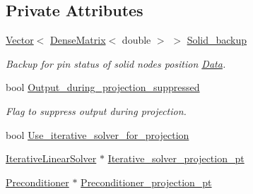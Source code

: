 \subsection*{Private Attributes}
\begin{DoxyCompactItemize}
\item 
\hyperlink{classoomph_1_1Vector}{Vector}$<$ \hyperlink{classoomph_1_1DenseMatrix}{Dense\+Matrix}$<$ double $>$ $>$ \hyperlink{classoomph_1_1ProjectionProblem_af085e8e2152466d7a98eebff07ea9271}{Solid\+\_\+backup}
\begin{DoxyCompactList}\small\item\em Backup for pin status of solid node\textquotesingle{}s position \hyperlink{classoomph_1_1Data}{Data}. \end{DoxyCompactList}\item 
bool \hyperlink{classoomph_1_1ProjectionProblem_a628ff404b240c75244eea7d38e5363dd}{Output\+\_\+during\+\_\+projection\+\_\+suppressed}
\begin{DoxyCompactList}\small\item\em Flag to suppress output during projection. \end{DoxyCompactList}\item 
bool \hyperlink{classoomph_1_1ProjectionProblem_a917be524f0312bcf05c399d7c05f95a5}{Use\+\_\+iterative\+\_\+solver\+\_\+for\+\_\+projection}
\item 
\hyperlink{classoomph_1_1IterativeLinearSolver}{Iterative\+Linear\+Solver} $\ast$ \hyperlink{classoomph_1_1ProjectionProblem_a74cb4279bf7d10be200610ca73be4d90}{Iterative\+\_\+solver\+\_\+projection\+\_\+pt}
\item 
\hyperlink{classoomph_1_1Preconditioner}{Preconditioner} $\ast$ \hyperlink{classoomph_1_1ProjectionProblem_ac351713a8fba2e5595955afaf65ab22a}{Preconditioner\+\_\+projection\+\_\+pt}
\end{DoxyCompactItemize}
